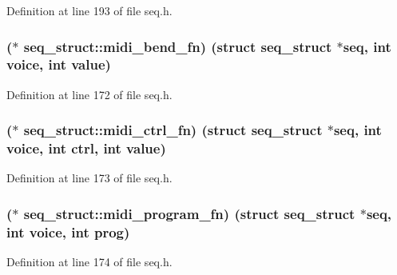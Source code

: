 Definition at line 193 of file seq.\+h.

\subsubsection[{\texorpdfstring{midi\+\_\+bend\+\_\+fn}{midi_bend_fn}}]{($\ast$ seq\+\_\+struct\+::midi\+\_\+bend\+\_\+fn) (struct {\bf seq\+\_\+struct} $\ast$seq, {\bf int} {\bf voice}, {\bf int} {\bf value})}\hypertarget{structseq__struct_affda5ec2ecdb197885828ea556215d80}{}\label{structseq__struct_affda5ec2ecdb197885828ea556215d80}


Definition at line 172 of file seq.\+h.

\subsubsection[{\texorpdfstring{midi\+\_\+ctrl\+\_\+fn}{midi_ctrl_fn}}]{($\ast$ seq\+\_\+struct\+::midi\+\_\+ctrl\+\_\+fn) (struct {\bf seq\+\_\+struct} $\ast$seq, {\bf int} {\bf voice}, {\bf int} ctrl, {\bf int} {\bf value})}\hypertarget{structseq__struct_a58780a55ec0f3ff87db12dfe8a76fc85}{}\label{structseq__struct_a58780a55ec0f3ff87db12dfe8a76fc85}


Definition at line 173 of file seq.\+h.

\subsubsection[{\texorpdfstring{midi\+\_\+program\+\_\+fn}{midi_program_fn}}]{($\ast$ seq\+\_\+struct\+::midi\+\_\+program\+\_\+fn) (struct {\bf seq\+\_\+struct} $\ast$seq, {\bf int} {\bf voice}, {\bf int} {\bf prog})}\hypertarget{structseq__struct_a20228dc9f25c2f1d37f0902e98138620}{}\label{structseq__struct_a20228dc9f25c2f1d37f0902e98138620}


Definition at line 174 of file seq.\+h.


